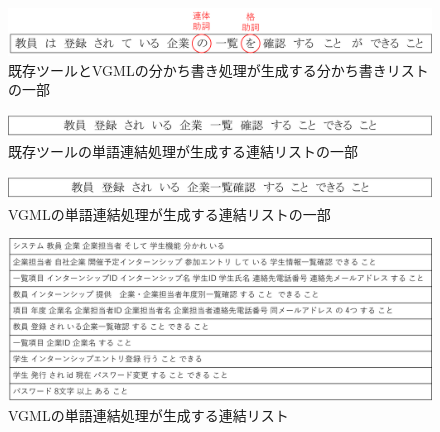 \begin{figure}[t]
    \begin{center}
        \includegraphics[width=1.0\columnwidth]{image/exis_wakati.png}
        \caption{既存ツールとVGMLの分かち書き処理が生成する分かち書きリストの一部}
        \label{fig:exis_wakati}
    \end{center}
\end{figure}

\begin{figure}[t]
    \begin{center}
        \includegraphics[width=1.0\columnwidth]{image/exis_connect.png}
        \caption{既存ツールの単語連結処理が生成する連結リストの一部}
        \label{fig:exis_connect}
    \end{center}
\end{figure}

\begin{figure}[t]
    \begin{center}
        \includegraphics[width=1.0\columnwidth]{image/vgml_connect.png}
        \caption{VGMLの単語連結処理が生成する連結リストの一部}
        \label{fig:vgml_connect}
    \end{center}
\end{figure}

\begin{figure}[p]
    \begin{center}
        \includegraphics[width=1.0\columnwidth]{image/vgml_connect_list.png}
        \caption{VGMLの単語連結処理が生成する連結リスト}
        \label{fig:vgml_connect_list}
    \end{center}
\end{figure}

